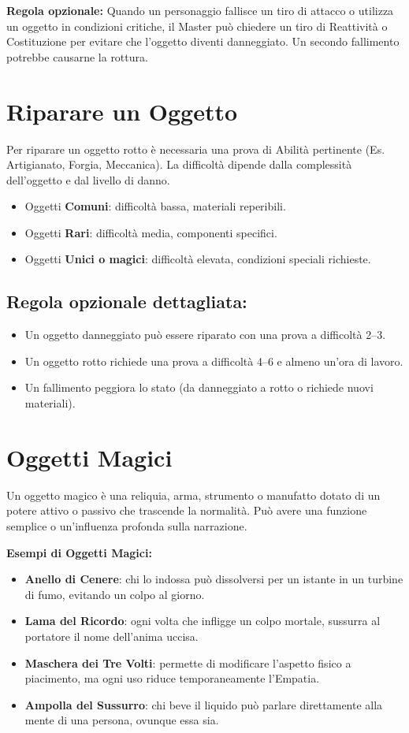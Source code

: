 \documentclass[../manuale_main.tex]{subfiles}
\begin{document}
\textbf{Regola opzionale:} Quando un personaggio fallisce un tiro di attacco o utilizza un oggetto in condizioni critiche, il Master può chiedere un tiro di Reattività o Costituzione per evitare che l’oggetto diventi danneggiato. Un secondo fallimento potrebbe causarne la rottura.

\section{Riparare un Oggetto}

\noindent
Per riparare un oggetto rotto è necessaria una prova di Abilità pertinente (Es. Artigianato, Forgia, Meccanica). La difficoltà dipende dalla complessità dell’oggetto e dal livello di danno.

\begin{itemize}
  \item Oggetti \textbf{Comuni}: difficoltà bassa, materiali reperibili.
  \item Oggetti \textbf{Rari}: difficoltà media, componenti specifici.
  \item Oggetti \textbf{Unici o magici}: difficoltà elevata, condizioni speciali richieste.
\end{itemize}

\subsection{Regola opzionale dettagliata:}
\begin{itemize}
  \item Un oggetto danneggiato può essere riparato con una prova a difficoltà 2--3.
  \item Un oggetto rotto richiede una prova a difficoltà 4--6 e almeno un’ora di lavoro.
  \item Un fallimento peggiora lo stato (da danneggiato a rotto o richiede nuovi materiali).
\end{itemize}

\section{Oggetti Magici}

Un oggetto magico è una reliquia, arma, strumento o manufatto dotato di un potere attivo o passivo che trascende la normalità. Può avere una funzione semplice o un’influenza profonda sulla narrazione.

\medskip
\textbf{Esempi di Oggetti Magici:}
\begin{itemize}
  \item \textbf{Anello di Cenere}: chi lo indossa può dissolversi per un istante in un turbine di fumo, evitando un colpo al giorno.
  \item \textbf{Lama del Ricordo}: ogni volta che infligge un colpo mortale, sussurra al portatore il nome dell’anima uccisa.
  \item \textbf{Maschera dei Tre Volti}: permette di modificare l’aspetto fisico a piacimento, ma ogni uso riduce temporaneamente l’Empatia.
  \item \textbf{Ampolla del Sussurro}: chi beve il liquido può parlare direttamente alla mente di una persona, ovunque essa sia.
\end{itemize}
\end{document}
